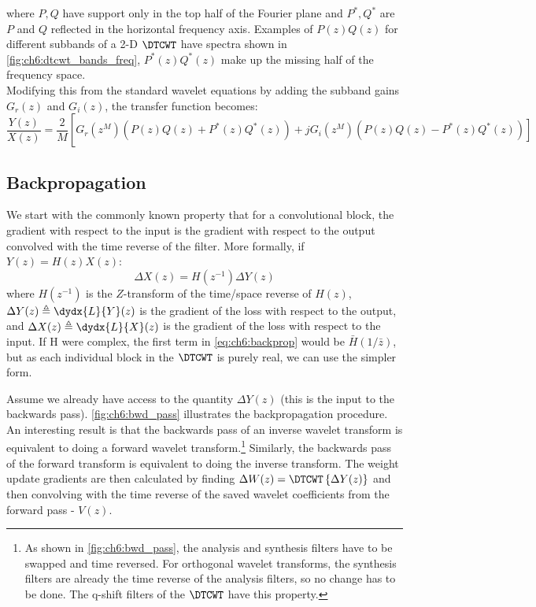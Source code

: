 where $P, Q$ have support only in the top half of the Fourier plane and $P^*,
Q^*$ are $P$ and $Q$ reflected in the horizontal frequency axis. Examples of
$P(z)Q(z)$ for different subbands of a 2-D $\DTCWT$ have spectra shown in
\autoref{fig:ch6:dtcwt_bands_freq}, $P^*(z)Q^*(z)$ make up the missing half of
the frequency space.\\ 

Modifying this from the standard wavelet equations by
adding the subband gains $G_r(z)$ and $G_i(z)$, the transfer function becomes:
\begin{equation}\label{eq:ch6:end_to_end2}
    \frac{Y(z)}{X(z)} = \frac{2}{M} \left[ \right. G_r(z^M) \left( P(z)Q(z) + P^*(z)Q^*(z) \right) +  
      \left. jG_i(z^M) \left(P(z)Q(z)-P^*(z)Q^*(z) \right) \right]
\end{equation}

\subsection{Backpropagation}
We start with the commonly known property that for a convolutional block, the
gradient with respect to the input is the gradient with respect to the output
convolved with the time reverse of the filter. More formally, if 
$Y(z) = H(z) X(z)$:
\begin{equation}\label{eq:ch6:backprop}
\Delta X(z) = H(z^{-1}) \Delta Y(z)
\end{equation}
where $H(z^{-1})$ is the $Z$-transform of the time/space reverse of $H(z)$,
$\Delta Y(z) \triangleq \dydx{L}{Y}(z)$ is the gradient of the loss with respect
to the output, and $\Delta X(z) \triangleq \dydx{L}{X}(z)$ is the gradient of
the loss with respect to the input. If H were complex, the first term in
\autoref{eq:ch6:backprop} would be $\bar{H}(1/\bar{z})$, but as each individual
block in the $\DTCWT$ is purely real, we can use the simpler form. 

Assume we already have access to the quantity $\Delta Y(z)$ (this is the input
to the backwards pass). \autoref{fig:ch6:bwd_pass} illustrates the
backpropagation procedure. An interesting result is that the backwards pass of
an inverse wavelet transform is equivalent to doing a forward wavelet
transform.\footnote{As shown in \autoref{fig:ch6:bwd_pass}, the analysis and
synthesis filters have to be swapped and time reversed. For orthogonal wavelet
transforms, the synthesis filters are already the time reverse of the analysis
filters, so no change has to be done. The q-shift filters of the $\DTCWT$
\cite{kingsbury_design_2003} have this property.} Similarly, the backwards pass
of the forward transform is equivalent to doing the inverse transform. The
weight update gradients are then calculated by finding 
$\Delta W(z) = \DTCWT\left\{ \Delta Y(z) \right\}$ and then convolving with the 
time reverse of the saved wavelet coefficients from the forward pass - $V(z)$.

